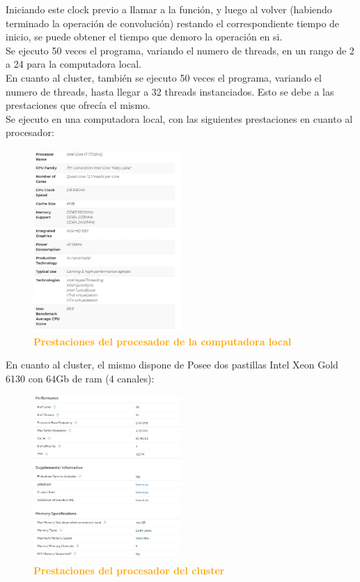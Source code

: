 \documentclass{article}
\begin{document}
Iniciando este clock previo a llamar a la función, y luego al volver (habiendo terminado la operación de convolución) restando el correspondiente tiempo de inicio, se puede obtener
el tiempo que demoro la operación en si. \\

Se ejecuto 50 veces el programa, variando el numero de threads, en un rango de 2 a 24  para la computadora local.\\

En cuanto al cluster, también se ejecuto 50 veces el programa, variando el numero de threads, hasta llegar a 32 threads instanciados. Esto se debe a las prestaciones
que ofrecía el mismo. \\

\clearpage
Se ejecuto en una computadora local, con las siguientes prestaciones en cuanto al procesador:
 \begin{figure}[H]
    \centering
      \includegraphics[width=0.50\textwidth]{figures/MICRO1.jpg}
       \centering
       \caption{\textbf{\textcolor{Orange}{Prestaciones del procesador de la computadora local}}}
    \end{figure}

En cuanto al cluster, el mismo dispone de Posee dos pastillas Intel Xeon Gold 6130 con 64Gb de ram (4 canales):
 \begin{figure}[H]
    \centering
      \includegraphics[width=0.50\textwidth]{figures/MICRO2.jpg}
       \centering
       \caption{\textbf{\textcolor{Orange}{Prestaciones del procesador del cluster}}}
    \end{figure}
\end{document}
